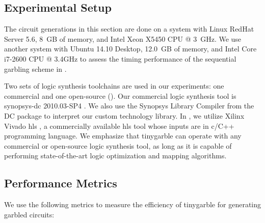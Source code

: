 \subsection{Experimental Setup}\label{ssec:eval-tinygarble-setup}
The circuit generations in this section are done on a system with Linux RedHat Server 5.6, 8~GB of memory, and Intel Xeon X5450 CPU @ 3~GHz.
We use another system with Ubuntu 14.10 Desktop, 12.0~GB of memory, and Intel Core i7-2600 CPU @ 3.4GHz to assess the timing performance of the sequential garbling scheme in .

Two sets of logic synthesis toolchains are used in our experiments: one commercial and one open-source ().
Our commercial logic synthesis tool is \gls{synopsys-dc} 2010.03-SP4 \cite{tool:DesignCompiler}.
We also use the Synopsys Library Compiler from the DC package to interpret our custom technology library.
In , we utilize Xilinx Vivado \acrshort{hls} \cite{tool:Vivado}, a commercially available \acrshort{hls} tool whose inputs are in \gls{c}/C++ programming language.
We emphasize that \gls{tinygarble} can operate with any commercial or open-source logic synthesis tool, as long as it is capable of performing state-of-the-art logic optimization and mapping algorithms.

\subsection{Performance Metrics}\label{ssec:eval-tinygarble-metric}
We use the following metrics to measure the efficiency of \gls{tinygarble} for generating garbled circuits:

